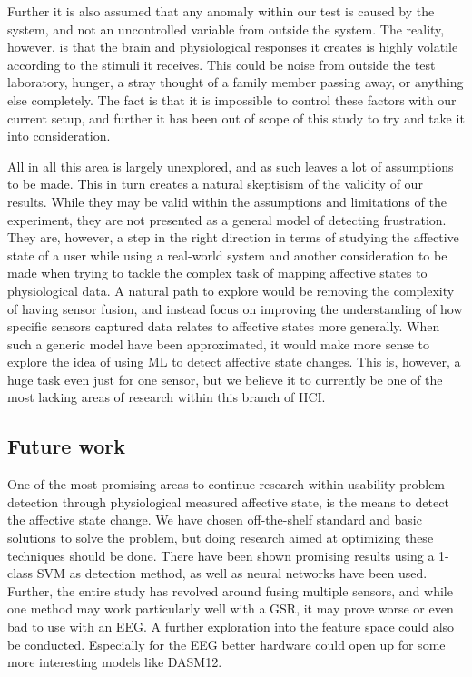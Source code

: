 Further it is also assumed that any anomaly within our test is caused by the system, and not an uncontrolled variable from outside the system. 
The reality, however, is that the brain and physiological responses it creates is highly volatile according to the stimuli it receives.
This could be noise from outside the test laboratory, hunger, a stray thought of a family member passing away, or anything else completely. 
The fact is that it is impossible to control these factors with our current setup, and further it has been out of scope of this study to try and take it into consideration.

All in all this area is largely unexplored, and as such leaves a lot of assumptions to be made.
This in turn creates a natural skeptisism of the validity of our results.
While they may be valid within the assumptions and limitations of the experiment, they are not presented as a general model of detecting frustration. 
They are, however, a step in the right direction in terms of studying the affective state of a user while using a real-world system and another consideration to be made when trying to tackle the complex task of mapping affective states to physiological data. 
A natural path to explore would be removing the complexity of having sensor fusion, and instead focus on improving the understanding of how specific sensors captured data relates to affective states more generally. 
When such a generic model have been approximated, it would make more sense to explore the idea of using ML to detect affective state changes.
This is, however, a huge task even just for one sensor, but we believe it to currently be one of the most lacking areas of research within this branch of HCI.


\subsection{Future work}
One of the most promising areas to continue research within usability problem detection through physiological measured affective state, is the means to detect the affective state change. 
We have chosen off-the-shelf standard and basic solutions to solve the problem, but doing research aimed at optimizing these techniques should be done. 
There have been shown promising results using a 1-class SVM as detection method, as well as neural networks have been used.
Further, the entire study has revolved around fusing multiple sensors, and while one method may work particularly well with a GSR, it may prove worse or even bad to use with an EEG. 
A further exploration into the feature space could also be conducted. 
Especially for the EEG better hardware could open up for some more interesting models like DASM12\cite{eeg_music_listening}. 

